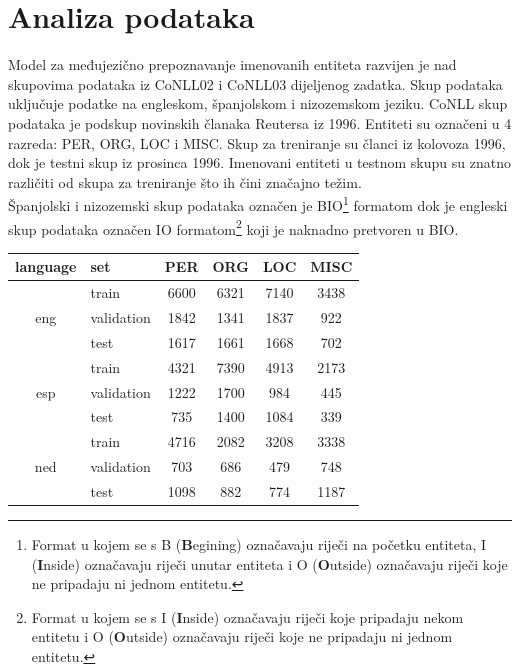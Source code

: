 \documentclass[times, utf8, seminar]{fer}
\begin{document}
\chapter{Analiza podataka}
Model za međujezično prepoznavanje imenovanih entiteta razvijen je nad skupovima podataka iz CoNLL02 i CoNLL03 dijeljenog zadatka. Skup podataka uključuje podatke na engleskom, španjolskom i nizozemskom jeziku. CoNLL skup podataka je podskup novinskih članaka Reutersa iz 1996. Entiteti su označeni u 4 razreda: PER, ORG, LOC i MISC. Skup za treniranje su članci iz kolovoza 1996, dok je testni skup iz prosinca 1996. Imenovani entiteti u testnom skupu su znatno različiti od skupa za treniranje što ih čini značajno težim.\citep{Ratinov:2009:DCM:1596374.1596399} \\
\indent Španjolski i nizozemski skup podataka označen je BIO\footnote{Format u kojem se s B (\textbf{B}egining) označavaju riječi na početku entiteta, I (\textbf{I}nside) označavaju riječi unutar entiteta i O (\textbf{O}utside) označavaju riječi koje ne pripadaju ni jednom entitetu.} formatom dok je engleski skup podataka označen IO formatom\footnote{Format u kojem se s I (\textbf{I}nside) označavaju riječi koje pripadaju nekom entitetu i O (\textbf{O}utside) označavaju riječi koje ne pripadaju ni jednom entitetu.} koji je naknadno pretvoren u BIO.
\begin{center}
\begin{tabular}{ clcccc }
\hline
\textbf{language} & \textbf{set} & \textbf{PER} & \textbf{ORG} & \textbf{LOC} & \textbf{MISC} \\ \hline
\multirow{3}{*}{eng} & train & 6600 & 6321 & 7140 & 3438 \\
 & validation & 1842 & 1341 & 1837 & 922 \\
 & test & 1617 & 1661 & 1668 & 702 \\ \hline
\multirow{3}{*}{esp} & train & 4321 & 7390 & 4913 & 2173 \\
 & validation & 1222 & 1700 & 984 & 445\\
 & test & 735 & 1400 & 1084  & 339 \\ \hline
\multirow{3}{*}{ned} & train & 4716 & 2082 & 3208 & 3338 \\
 & validation & 703 & 686 & 479 & 748 \\
 & test & 1098 & 882 & 774 & 1187 \\ \hline
\end{tabular}
\end{center}
\newpage
\end{document}
